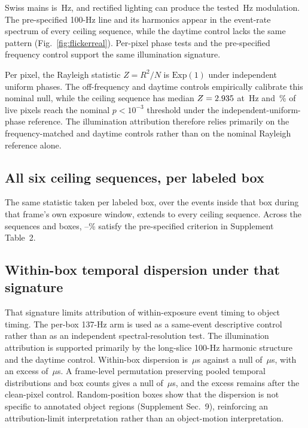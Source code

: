 \documentclass[10pt,twocolumn,letterpaper]{article}
\newcommand{\micro}{\ensuremath{\mu}}
\begin{document}
Swiss mains is \mainsHz\,Hz, and rectified lighting can produce the tested
\flickerLineHz\,Hz modulation. The pre-specified 100-Hz line and its harmonics appear in
the event-rate spectrum of every ceiling sequence, while the daytime control lacks the
same pattern (Fig.~\ref{fig:flickerreal}). Per-pixel phase tests and the pre-specified
frequency control support the same illumination signature.

Per pixel, the Rayleigh statistic $Z=R^{2}/N$ is $\mathrm{Exp}(1)$ under
independent uniform phases. The off-frequency and daytime controls empirically
calibrate this nominal null, while the ceiling sequence has median
$Z=2.935{}$ at \flickerLineHz\,Hz and
\flickerFracLockedPct\,\% of live pixels reach the nominal $p<10^{-3}$ threshold under
the independent-uniform-phase reference. The illumination attribution therefore relies
primarily on the frequency-matched and daytime controls rather than on the nominal Rayleigh
reference alone.

\subsection{All six ceiling sequences, per labeled box}

The same statistic taken per labeled box, over the events inside that box during that
frame's own exposure window, extends to every ceiling sequence. Across the
\dsecCeilingSeqs{} sequences and \sixBoxes{} boxes, \sixLockedLoPct{}--\sixLockedHiPct\%
satisfy the pre-specified criterion in Supplement Table~2.


\subsection{Within-box temporal dispersion under that signature}
\label{sec:cost}

That signature limits attribution of within-exposure event timing to object timing. The
per-box 137-Hz arm is used as a same-event descriptive control rather than as an independent
spectral-resolution test. The illumination attribution is supported primarily by the long-slice
100-Hz harmonic structure and the daytime control.
Within-box dispersion is \sigmaEvtNight\,\micro s against a null of
\sigmaEvtNullNight\,\micro s, with an excess of \sigmaEvtExcessNight\,\micro s.
A frame-level permutation preserving pooled temporal distributions and box counts gives a
null of \permNull\,\micro s, and the excess remains after the clean-pixel control.
Random-position boxes show that the dispersion is not specific to annotated object regions
(Supplement Sec.~9), reinforcing an attribution-limit interpretation rather than an
object-motion interpretation.
\end{document}
